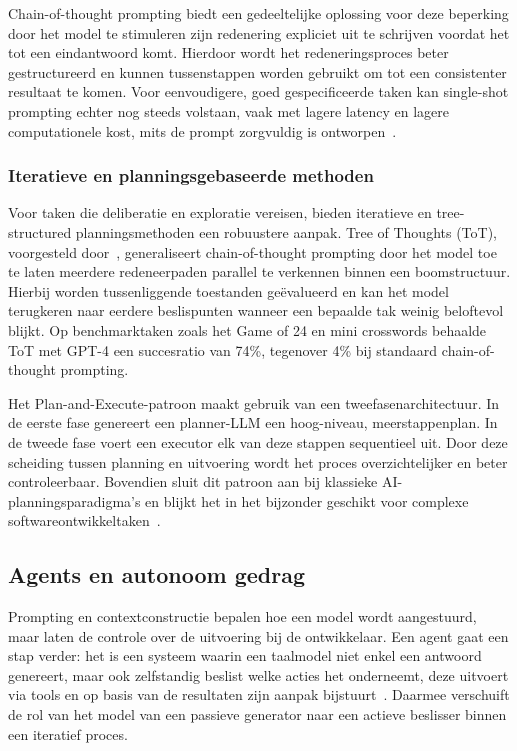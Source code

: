 Chain-of-thought prompting biedt een gedeeltelijke oplossing voor deze beperking door het model te stimuleren zijn redenering expliciet uit te schrijven voordat het tot een eindantwoord komt. Hierdoor wordt het redeneringsproces beter gestructureerd en kunnen tussenstappen worden gebruikt om tot een consistenter resultaat te komen. Voor eenvoudigere, goed gespecificeerde taken kan single-shot prompting echter nog steeds volstaan, vaak met lagere latency en lagere computationele kost, mits de prompt zorgvuldig is ontworpen~\cite{wei2022cot}.

\subsubsection{Iteratieve en planningsgebaseerde methoden}
Voor taken die deliberatie en exploratie vereisen, bieden iteratieve en tree-structured planningsmethoden een robuustere aanpak. Tree of Thoughts (ToT), voorgesteld door~\cite{yao2023tot}, generaliseert chain-of-thought prompting door het model toe te laten meerdere redeneerpaden parallel te verkennen binnen een boomstructuur. Hierbij worden tussenliggende toestanden geëvalueerd en kan het model terugkeren naar eerdere beslispunten wanneer een bepaalde tak weinig beloftevol blijkt. Op benchmarktaken zoals het Game of 24 en mini crosswords behaalde ToT met GPT-4 een succesratio van 74\%, tegenover 4\% bij standaard chain-of-thought prompting.

Het Plan-and-Execute-patroon maakt gebruik van een tweefasenarchitectuur. In de eerste fase genereert een planner-LLM een hoog-niveau, meerstappenplan. In de tweede fase voert een executor elk van deze stappen sequentieel uit. Door deze scheiding tussen planning en uitvoering wordt het proces overzichtelijker en beter controleerbaar. Bovendien sluit dit patroon aan bij klassieke AI-planningsparadigma's en blijkt het in het bijzonder geschikt voor complexe softwareontwikkeltaken~\cite{wang2023agents}.

\subsection{Agents en autonoom gedrag}\label{subsec:agents}

Prompting en contextconstructie bepalen hoe een model wordt aangestuurd, maar laten de controle over de uitvoering bij de ontwikkelaar. Een agent gaat een stap verder: het is een systeem waarin een taalmodel niet enkel een antwoord genereert, maar ook zelfstandig beslist welke acties het onderneemt, deze uitvoert via tools en op basis van de resultaten zijn aanpak bijstuurt~\cite{wang2023agents}. Daarmee verschuift de rol van het model van een passieve generator naar een actieve beslisser binnen een iteratief proces.

